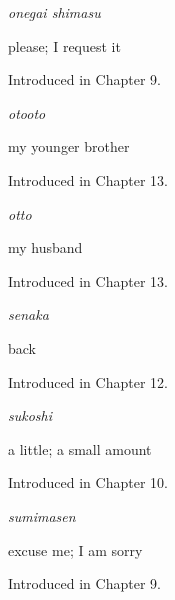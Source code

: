 \noindent\begin{minipage}[t]{\linewidth}
\raggedright
\textbf{}\enspace\emph{onegai shimasu}\par
\small please; I request it\par
\footnotesize Introduced in Chapter 9.
\end{minipage}\par\medskip

\noindent\begin{minipage}[t]{\linewidth}
\raggedright
\textbf{}\enspace\emph{otooto}\par
\small my younger brother\par
\footnotesize Introduced in Chapter 13.
\end{minipage}\par\medskip

\noindent\begin{minipage}[t]{\linewidth}
\raggedright
\textbf{}\enspace\emph{otto}\par
\small my husband\par
\footnotesize Introduced in Chapter 13.
\end{minipage}\par\medskip

\noindent\begin{minipage}[t]{\linewidth}
\raggedright
\textbf{}\enspace\emph{senaka}\par
\small back\par
\footnotesize Introduced in Chapter 12.
\end{minipage}\par\medskip

\noindent\begin{minipage}[t]{\linewidth}
\raggedright
\textbf{}\enspace\emph{sukoshi}\par
\small a little; a small amount\par
\footnotesize Introduced in Chapter 10.
\end{minipage}\par\medskip

\noindent\begin{minipage}[t]{\linewidth}
\raggedright
\textbf{}\enspace\emph{sumimasen}\par
\small excuse me; I am sorry\par
\footnotesize Introduced in Chapter 9.
\end{minipage}\par\medskip

